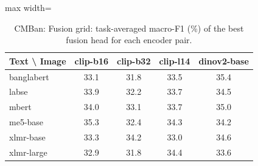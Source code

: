 \begin{table}[t]
\centering
\small
\caption{CMBan: Fusion grid: task-averaged macro-F1 (\%) of the best fusion head for each encoder pair.}
\label{tab:grid_fine_cmban}
\begin{adjustbox}{max width=\columnwidth}
\begin{tabular}{lcccc}
\toprule
Text \textbackslash{} Image & clip-b16 & clip-b32 & clip-l14 & dinov2-base \\
\midrule
banglabert & 33.1 & 31.8 & 33.5 & 35.4 \\
labse & 33.9 & 32.2 & 33.7 & 34.5 \\
mbert & 34.0 & 33.1 & 33.7 & 35.0 \\
me5-base & 35.3 & 32.4 & 34.3 & 34.2 \\
xlmr-base & 33.3 & 34.2 & 33.0 & 34.6 \\
xlmr-large & 32.9 & 31.8 & 34.4 & 33.6 \\
\bottomrule
\end{tabular}
\end{adjustbox}
\end{table}
